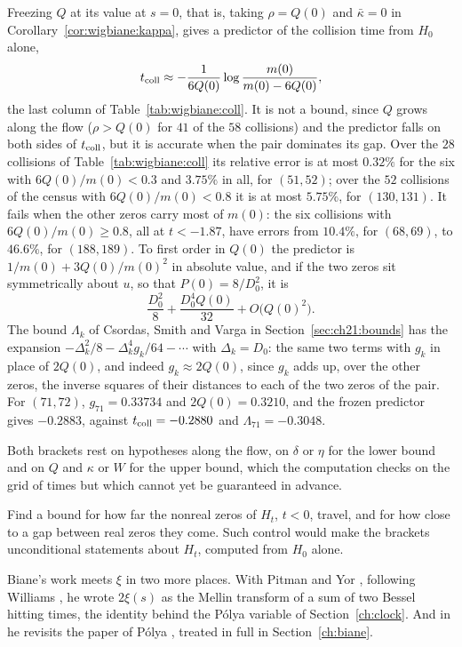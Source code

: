 Freezing $Q$ at its value at $s=0$, that is, taking $\rho=Q(0)$ and $\bar\kappa=0$ in Corollary~\ref{cor:wigbiane:kappa}, gives a predictor of the collision time from $H_0$ alone,
\[
t_{\rm coll}\approx-\frac1{6Q(0)}\log\frac{m(0)}{m(0)-6Q(0)},
\]
the last column of Table~\ref{tab:wigbiane:coll}. It is not a bound, since $Q$ grows along the flow ($\rho>Q(0)$ for $41$ of the $58$ collisions) and the predictor falls on both sides of $t_{\rm coll}$, but it is accurate when the pair dominates its gap. Over the $28$ collisions of Table~\ref{tab:wigbiane:coll} its relative error is at most $0.32\%$ for the six with $6Q(0)/m(0)<0.3$ and $3.75\%$ in all, for $(51,52)$; over the $52$ collisions of the census with $6Q(0)/m(0)<0.8$ it is at most $5.75\%$, for $(130,131)$. It fails when the other zeros carry most of $m(0)$: the six collisions with $6Q(0)/m(0)\ge0.8$, all at $t<-1.87$, have errors from $10.4\%$, for $(68,69)$, to $46.6\%$, for $(188,189)$. To first order in $Q(0)$ the predictor is $1/m(0)+3Q(0)/m(0)^2$ in absolute value, and if the two zeros sit symmetrically about $u$, so that $P(0)=8/D_0^2$, it is
\[
\frac{D_0^2}8+\frac{D_0^4Q(0)}{32}+O\big(Q(0)^2\big).
\]
The bound $\Lambda_k$ of Csordas, Smith and Varga \cite{CSV94} in Section~\ref{sec:ch21:bounds} has the expansion $-\Delta_k^2/8-\Delta_k^4g_k/64-\cdots$ with $\Delta_k=D_0$: the same two terms with $g_k$ in place of $2Q(0)$, and indeed $g_k\approx2Q(0)$, since $g_k$ adds up, over the other zeros, the inverse squares of their distances to each of the two zeros of the pair. For $(71,72)$, $g_{71}=0.33734$ and $2Q(0)=0.3210$, and the frozen predictor gives $-0.2883$, against $t_{\rm coll}=-0.2880$ and $\Lambda_{71}=-0.3048$.

Both brackets rest on hypotheses along the flow, on $\delta$ or $\eta$ for the lower bound and on $Q$ and $\kappa$ or $W$ for the upper bound, which the computation checks on the grid of times but which cannot yet be guaranteed in advance.

\begin{problem}\label{prob:wigbiane:control}
Find a bound for how far the nonreal zeros of $H_t$, $t<0$, travel, and for how close to a gap between real zeros they come. Such control would make the brackets unconditional statements about $H_t$, computed from $H_0$ alone.
\end{problem}

Biane's work meets $\xi$ in two more places. With Pitman and Yor \cite{BPY01}, following Williams \cite{Williams90}, he wrote $2\xi(s)$ as the Mellin transform of a sum of two Bessel hitting times, the identity behind the P\'olya variable of Section~\ref{ch:clock}. And in \cite{Biane09} he revisits the paper of P\'olya \cite{Polya}, treated in full in Section~\ref{ch:biane}.

